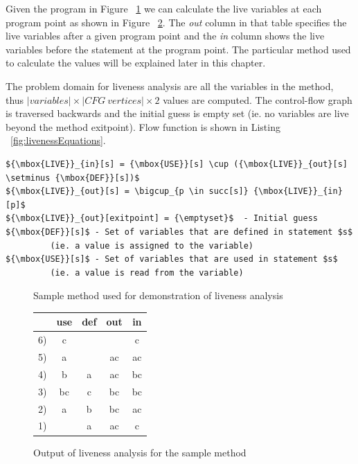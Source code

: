 Given the program in Figure ~\ref{fig:livenessProgram} we can calculate the live variables at each program point as shown in Figure ~\ref{fig:livenessResults}. The \emph{out} column in that table specifies the live variables after a given program point and the \emph{in} column shows the live variables before the statement at the program point. The particular method used to calculate the values will be explained later in this chapter.

The problem domain for liveness analysis are all the variables in the method, thus $|variables| \times |CFG\ vertices| \times 2$ values are computed. The control-flow graph is traversed backwards and the initial guess is empty set (ie. no variables are live beyond the method exitpoint). Flow function is shown in Listing ~\ref{fig:livenessEquations}.

\begin{lstlisting}[mathescape,caption=Flow equations for liveness analysis,label=fig:livenessEquations]
${\mbox{LIVE}}_{in}[s] = {\mbox{USE}}[s] \cup ({\mbox{LIVE}}_{out}[s] \setminus {\mbox{DEF}}[s])$
${\mbox{LIVE}}_{out}[s] = \bigcup_{p \in succ[s]} {\mbox{LIVE}}_{in}[p]$
${\mbox{LIVE}}_{out}[exitpoint] = {\emptyset}$  - Initial guess
${\mbox{DEF}}[s]$ - Set of variables that are defined in statement $s$
         (ie. a value is assigned to the variable)
${\mbox{USE}}[s]$ - Set of variables that are used in statement $s$
         (ie. a value is read from the variable)
\end{lstlisting}

\begin{figure}
\begin{center}
\caption{Sample method used for demonstration of liveness analysis}
\label{fig:livenessProgram}
\end{center}
\end{figure}

\begin{figure}
\begin{center}
\begin{tabular}{ l | c c | c c }
& use & def & out & in \\
\hline
6) & c & & & c \\
5) & a & & ac & ac \\
4) & b & a & ac & bc \\
3) & bc & c & bc & bc \\
2) & a & b & bc & ac \\
1) & & a & ac & c \\
\end{tabular}
\caption{Output of liveness analysis for the sample method}
\label{fig:livenessResults}
\end{center}
\end{figure}

